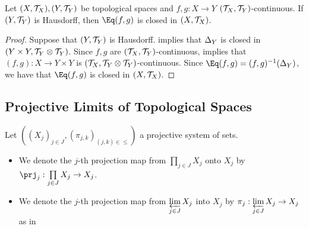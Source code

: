 \documentclass{book}
\begin{document}
\begin{ex} 
	Let $(X, \mathcal{T}_X), (Y, \mathcal{T}_Y)$ be topological spaces and $f,g:X \rightarrow Y$ $(\mathcal{T}_X, \mathcal{T}_Y)$-continuous. If $(Y, \mathcal{T}_Y)$ is Hausdorff, then $\Eq(f,g)$ is closed in $(X, \mathcal{T}_X)$.
\end{ex}

\begin{proof}
	Suppose that $(Y, \mathcal{T}_Y)$ is Hausdorff.  implies that $\Delta_Y$ is closed in $(Y \times Y, \mathcal{T}_Y \otimes \mathcal{T}_Y)$. Since $f,g$ are $(\mathcal{T}_X, \mathcal{T}_Y)$-continuous,  implies that $(f,g): X \rightarrow Y \times Y$ is $(\mathcal{T}_X, \mathcal{T}_Y \otimes \mathcal{T}_Y)$-continuous. Since $\Eq(f,g) = (f,g)^{-1}(\Del_Y)$, we have that $\Eq(f,g)$ is closed in $(X, \mathcal{T}_X)$.
\end{proof}

































\subsection{Projective Limits of Topological Spaces}

\begin{note}
	Let $((X_j)_{j \in J}, (\pi_{j,k})_{(j,k) \in \leq})$ a projective system of sets.
	\begin{itemize}
		 \item We denote the $j$-th projection map from $\prod\limits_{j \in J} X_j$ onto $X_j$ by $\prj_j: \prod\limits_{j \in J} X_j \rightarrow X_j$.
		 \item We denote the $j$-th projection map from $\varprojlim\limits_{j \in J} X_j$ into $X_j$ by $\pi_j: \varprojlim\limits_{j \in J} X_j \rightarrow X_j$ as in  
	\end{itemize}
\end{note}
\end{document}
